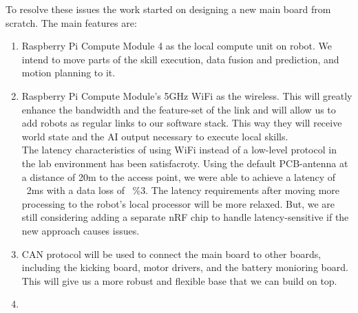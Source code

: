 \documentclass[runningheads]{llncs}
\begin{document}
To resolve these issues the work started on designing a new main board from scratch. The main features are:
\begin{enumerate}
    \item Raspberry Pi Compute Module 4 as the local compute unit on robot. We intend to move parts of the skill execution, data fusion and prediction, and motion planning to it.
    \item Raspberry Pi Compute Module's 5GHz WiFi as the wireless. This will greatly enhance the bandwidth and the feature-set of the link and will allow us to add robots as regular links to our software stack. This way they will receive world state and the AI output necessary to execute local skills.\\
    The latency characteristics of using WiFi instead of a low-level protocol in the lab environment has been satisfacroty. Using the default PCB-antenna at a distance of 20m to the access point, we were able to achieve a latency of ~2ms with a data loss of ~\%3. The latency requirements after moving more processing to the robot's local processor will be more relaxed. But, we are still considering adding a separate nRF chip to handle latency-sensitive if the new approach causes issues.
    \item CAN protocol will be used to connect the main board to other boards, including the kicking board, motor drivers, and the battery monioring board. This will give us a more robust and flexible base that we can build on top.
    \item 
\end{enumerate}
\end{document}
